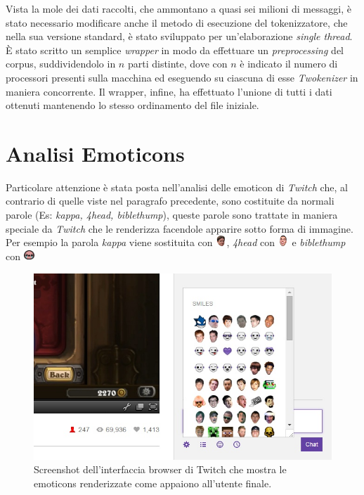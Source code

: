 \documentclass[a4paper,12pt,openright,twoside]{report}
\theoremstyle{definition}
\begin{document}
Vista la mole dei dati raccolti, che ammontano a quasi sei milioni di messaggi, è stato necessario modificare anche il metodo di esecuzione del tokenizzatore, 
che nella sua versione standard, è stato sviluppato per un'elaborazione \emph{single thread}.
\`E stato scritto un semplice \emph{wrapper} in modo da effettuare un \emph{preprocessing} del corpus, 
suddividendolo in $n$ parti distinte, dove con $n$ è indicato il numero di processori presenti 
sulla macchina ed
eseguendo su ciascuna di esse \emph{Twokenizer} in maniera concorrente.
Il wrapper, infine, ha effettuato l'unione di tutti i dati ottenuti mantenendo lo stesso 
ordinamento del file iniziale.
\newpage
\section{Analisi Emoticons}
Particolare attenzione è stata posta nell'analisi delle emoticon di \emph{Twitch} che,
al contrario di quelle viste nel paragrafo precedente, sono costituite da normali parole (Es: \emph{kappa, 4head, biblethump}),
queste parole sono trattate in maniera speciale da \emph{Twitch} che le renderizza facendole apparire sotto forma di immagine.
Per esempio la parola \emph{kappa} viene sostituita con 
\includegraphics[height=0.4cm, width=0.4cm]{Immagini/Emoticons/kappahd.png}, 
\emph{4head} con \includegraphics[height=0.4cm, width=0.4cm]{Immagini/Emoticons/4head.png} e 
\emph{biblethump} con
\includegraphics[height=0.4cm, width=0.4cm]{Immagini/Emoticons/biblethump.png} 

\begin{figure}[ht]
	\centering
	\includegraphics[scale=0.5]{Immagini/TwitchEmotes.jpg}
	\caption{Screenshot dell'interfaccia browser di Twitch che mostra le emoticons renderizzate
	come appaiono all'utente finale.}
	\label{fig:TwitchEmotes}
\end{figure}
\end{document}
